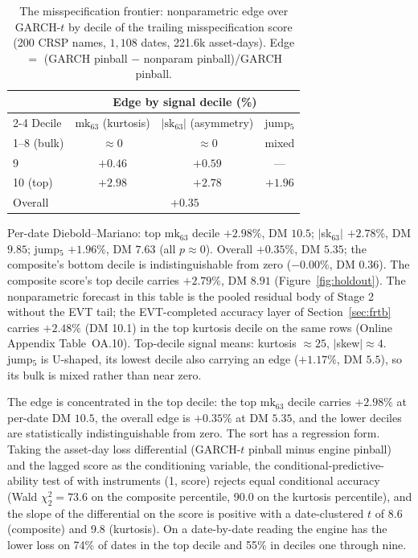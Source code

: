 \documentclass[11pt]{article}
\theoremstyle{remark}
\begin{document}
\begin{table}[t]
\centering
\begin{threeparttable}
\caption{The misspecification frontier: nonparametric edge over
GARCH-$t$ by decile of the trailing misspecification score (200 CRSP
names, $1{,}108$ dates, 221.6k asset-days). Edge $=$ (GARCH pinball $-$ nonparam
pinball)/GARCH pinball.}
\label{tab:frontier}
\begin{tabular}{lccc}
\toprule
& \multicolumn{3}{c}{Edge by signal decile (\%)} \\
\cmidrule(lr){2-4}
Decile & $\mathrm{mk}_{63}$ (kurtosis) & $|\mathrm{sk}_{63}|$ (asymmetry) & jump$_5$ \\
\midrule
1--8 (bulk) & $\approx 0$ & $\approx 0$ & mixed \\
9 & $+0.46$ & $+0.59$ & --- \\
10 (top) & $\mathbf{+2.98}$ & $\mathbf{+2.78}$ & $+1.96$ \\
\midrule
Overall & \multicolumn{3}{c}{$+0.35$} \\
\bottomrule
\end{tabular}
\begin{tablenotes}\footnotesize
\item Per-date Diebold--Mariano: top $\mathrm{mk}_{63}$ decile
$+2.98\%$, DM $10.5$; $|$sk$_{63}|$ $+2.78\%$, DM $9.85$; jump$_5$
$+1.96\%$, DM $7.63$ (all $p \approx 0$). Overall $+0.35\%$, DM $5.35$;
the composite's bottom decile is indistinguishable from zero ($-0.00\%$, DM $0.36$).
The composite score's top decile carries $+2.79\%$, DM $8.91$
(Figure~\ref{fig:holdout}). The nonparametric forecast in this table is the pooled residual body of Stage 2 without the EVT tail; the EVT-completed accuracy layer of Section~\ref{sec:frtb} carries $+2.48\%$ (DM 10.1) in the top kurtosis decile on the same rows (Online Appendix Table~OA.10). Top-decile signal means: kurtosis
$\approx 25$, $|$skew$| \approx 4$. jump$_5$ is U-shaped, its lowest
decile also carrying an edge ($+1.17\%$, DM $5.5$), so its bulk is mixed
rather than near zero.
\end{tablenotes}
\end{threeparttable}
\end{table}

The edge is concentrated in the top decile: the top $\mathrm{mk}_{63}$ decile
carries $+2.98\%$ at per-date DM $10.5$, the overall edge is $+0.35\%$ at
DM $5.35$, and the lower deciles are statistically indistinguishable
from zero. The sort has a regression form. Taking the asset-day loss differential (GARCH-$t$ pinball minus engine pinball) and the lagged score as the conditioning variable, the conditional-predictive-ability test of \citet{giacominiwhite2006} with instruments (1, score) rejects equal conditional accuracy (Wald $\chi^2_2=73.6$ on the composite percentile, 90.0 on the kurtosis percentile), and the slope of the differential on the score is positive with a date-clustered $t$ of 8.6 (composite) and 9.8 (kurtosis). On a date-by-date reading the engine has the lower loss on 74\% of dates in the top decile and 55\% in deciles one through nine.
\end{document}
